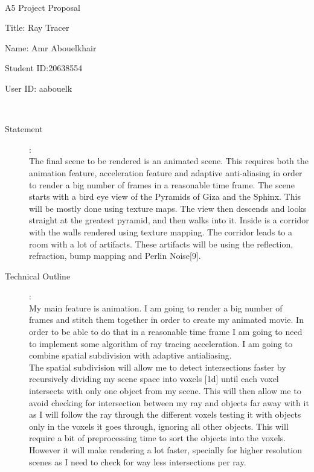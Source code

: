 \documentclass {article}
\begin{document}
~\vfill
\begin{center}
\Large

A5 Project Proposal

Title: Ray Tracer

Name: Amr Abouelkhair

Student ID:20638554

User ID: aabouelk
\end{center}
\vfill ~\vfill~
\newpage
{}
\begin{description}

\item[Statement]:\\
	The final scene to be rendered is an animated scene. This requires both the animation feature, acceleration feature and adaptive anti-aliasing in order to render a big
	number of frames in a reasonable time frame. The scene starts with a bird eye view of the Pyramids of Giza and the Sphinx. This will be mostly done using texture 
	maps. The view then descends and looks straight at the greatest pyramid, and then walks into it. Inside is a corridor with the walls rendered using texture mapping. 
	The corridor leads to a room with a lot of artifacts. These artifacts will be using the reflection, refraction, bump mapping and Perlin Noise[9]. 

\item[Technical Outline]:\\
    My main feature is animation. I am going to render a big number of frames and stitch them together in order to create my animated movie. In order to be able to do that 
    in a reasonable time frame I am going to need to implement some algorithm of ray tracing acceleration. I am going to combine spatial subdivision with adaptive antialiasing.\\
    The spatial subdivision will allow me to detect intersections faster by recursively dividing my scene space into voxels [1d] until each voxel intersects with only one object from my scene. 
    This will then allow me to avoid checking for intersection between my ray and objects far away with it as I will follow the ray through the different voxels testing it with objects only in the voxels it goes through, ignoring all other objects.
    This will require a bit of preprocessing time to sort the objects into the voxels. However it will make rendering a lot faster, specially for higher resolution scenes as I need to check for way less intersections per ray.\\
    

\end{description}
\end{document}
